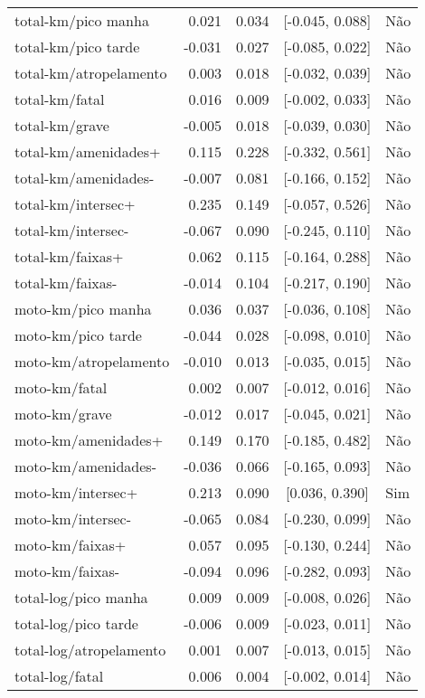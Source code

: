 \begin{longtable}{lrrcl}
total-km/pico manha & 0.021 & 0.034 & {}[-0.045, 0.088] & Não\\
total-km/pico tarde & -0.031 & 0.027 & {}[-0.085, 0.022] & Não\\
total-km/atropelamento & 0.003 & 0.018 & {}[-0.032, 0.039] & Não\\
total-km/fatal & 0.016 & 0.009 & {}[-0.002, 0.033] & Não\\
total-km/grave & -0.005 & 0.018 & {}[-0.039, 0.030] & Não\\
total-km/amenidades+ & 0.115 & 0.228 & {}[-0.332, 0.561] & Não\\
total-km/amenidades- & -0.007 & 0.081 & {}[-0.166, 0.152] & Não\\
total-km/intersec+ & 0.235 & 0.149 & {}[-0.057, 0.526] & Não\\
total-km/intersec- & -0.067 & 0.090 & {}[-0.245, 0.110] & Não\\
total-km/faixas+ & 0.062 & 0.115 & {}[-0.164, 0.288] & Não\\
total-km/faixas- & -0.014 & 0.104 & {}[-0.217, 0.190] & Não\\
moto-km/pico manha & 0.036 & 0.037 & {}[-0.036, 0.108] & Não\\
moto-km/pico tarde & -0.044 & 0.028 & {}[-0.098, 0.010] & Não\\
moto-km/atropelamento & -0.010 & 0.013 & {}[-0.035, 0.015] & Não\\
moto-km/fatal & 0.002 & 0.007 & {}[-0.012, 0.016] & Não\\
moto-km/grave & -0.012 & 0.017 & {}[-0.045, 0.021] & Não\\
moto-km/amenidades+ & 0.149 & 0.170 & {}[-0.185, 0.482] & Não\\
moto-km/amenidades- & -0.036 & 0.066 & {}[-0.165, 0.093] & Não\\
moto-km/intersec+ & 0.213 & 0.090 & {}[0.036, 0.390] & Sim\\
moto-km/intersec- & -0.065 & 0.084 & {}[-0.230, 0.099] & Não\\
moto-km/faixas+ & 0.057 & 0.095 & {}[-0.130, 0.244] & Não\\
moto-km/faixas- & -0.094 & 0.096 & {}[-0.282, 0.093] & Não\\
total-log/pico manha & 0.009 & 0.009 & {}[-0.008, 0.026] & Não\\
total-log/pico tarde & -0.006 & 0.009 & {}[-0.023, 0.011] & Não\\
total-log/atropelamento & 0.001 & 0.007 & {}[-0.013, 0.015] & Não\\
total-log/fatal & 0.006 & 0.004 & {}[-0.002, 0.014] & Não\\

\end{longtable}
